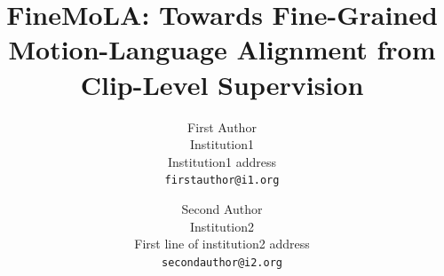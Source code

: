 \documentclass[10pt,twocolumn,letterpaper]{article}
\title{FineMoLA: Towards Fine-Grained Motion-Language Alignment from Clip-Level Supervision}
\author{First Author\\
Institution1\\
Institution1 address\\
{\tt\small firstauthor@i1.org}
\and
Second Author\\
Institution2\\
First line of institution2 address\\
{\tt\small secondauthor@i2.org}
}
\begin{document}
\maketitle
    






{
    \small
    
    
}


\end{document}
